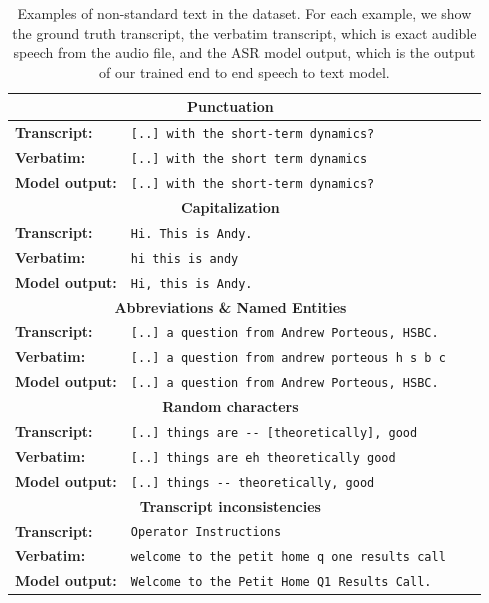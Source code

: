 \begin{table}[ht]
\begin{tabular}{ l p{9.6cm} c c }

 \hline
 \multicolumn{2}{c}{\textbf{Punctuation}} \\
 \hline
 \textbf{Transcript:} & \verb|[..] with the short-term dynamics?| \\ 
 \textbf{Verbatim:} & \verb|[..] with the short term dynamics| \\
 \textbf{Model output:} & \verb|[..] with the short-term dynamics?| \\
 \hline\hline

 \multicolumn{2}{c}{\textbf{Capitalization}} \\
 \hline
 \textbf{Transcript:} & \verb|Hi. This is Andy.| \\ 
 \textbf{Verbatim:} & \verb|hi this is andy| \\
 \textbf{Model output:} & \verb|Hi, this is Andy.| \\
 \hline\hline
 
 \multicolumn{2}{c}{\textbf{Abbreviations \& Named Entities}} \\
 \hline
 \textbf{Transcript:} & \verb|[..] a question from Andrew Porteous, HSBC.| \\ 
 \textbf{Verbatim:} & \verb|[..] a question from andrew porteous h s b c| \\
 \textbf{Model output:} & \verb|[..] a question from Andrew Porteous, HSBC.| \\
 \hline\hline
 
 \multicolumn{2}{c}{\textbf{Random characters}} \\
 \hline
 \textbf{Transcript:} & \verb|[..] things are -- [theoretically], good| \\ 
 \textbf{Verbatim:} & \verb|[..] things are eh theoretically good| \\
 \textbf{Model output:} & \verb|[..] things -- theoretically, good| \\
 \hline\hline
 
 \multicolumn{2}{c}{\textbf{Transcript inconsistencies}} \\
 \hline
 \textbf{Transcript:} & \verb|Operator Instructions| \\ 
 \textbf{Verbatim:} & \verb|welcome to the petit home q one results call| \\
 \textbf{Model output:} & \verb|Welcome to the Petit Home Q1 Results Call.|\\
 \hline\hline
\end{tabular}
\caption{\label{table:examples}Examples of non-standard text in the dataset. For each example, we show the ground truth transcript, the verbatim transcript, which is exact audible speech from the audio file, and the ASR model output, which is the output of our trained end to end speech to text model.}
\end{table}



